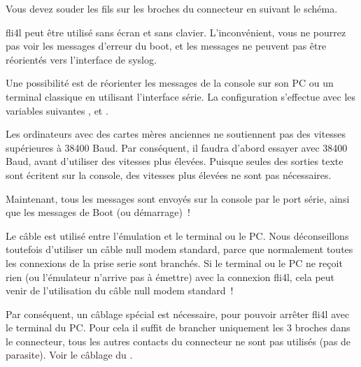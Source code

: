     Vous devez souder les fils sur les broches du connecteur en suivant le schéma.



    fli4l peut être utilisé sans écran et sans clavier. L'inconvénient,
    vous ne pourrez pas voir les messages d'erreur du boot, et les messages
    ne peuvent pas être réorientés vers l'interface de syslog.

    Une possibilité est de réorienter les messages de la console sur son
    PC ou un terminal classique en utilisant l'interface série. La configuration
    s'effectue avec les variables suivantes
    ,
     et
    .

    Les ordinateurs avec des cartes mères anciennes ne soutiennent pas des
    vitesses supérieures à 38400 Baud. Par conséquent, il faudra d'abord
    essayer avec 38400 Baud, avant d'utiliser des vitesses plus élevées.
    Puisque seules des sorties texte sont écritent sur la console, des vitesses
    plus élevées ne sont pas nécessaires.

    Maintenant, tous les messages sont envoyés sur la console par le port série,
    ainsi que les messages de Boot (ou démarrage)~!

    Le câble  est utilisé entre l'émulation
    et le terminal ou le PC. Nous déconseillons toutefois d'utiliser un câble
    null modem standard, parce que normalement toutes les connexions de la prise
    serie sont branchés. Si le terminal ou le PC ne reçoit rien (ou l'émulateur
    n'arrive pas à émettre) avec la connexion fli4l, cela peut venir de
    l'utilisation du câble null modem standard~!

    Par conséquent, un câblage spécial est nécessaire, pour pouvoir arrêter
    fli4l avec le terminal du PC. Pour cela il suffit de brancher uniquement
    les 3 broches dans le connecteur, tous les autres contacts du connecteur
    ne sont pas utilisés (pas de parasite). Voir le câblage
    du .

